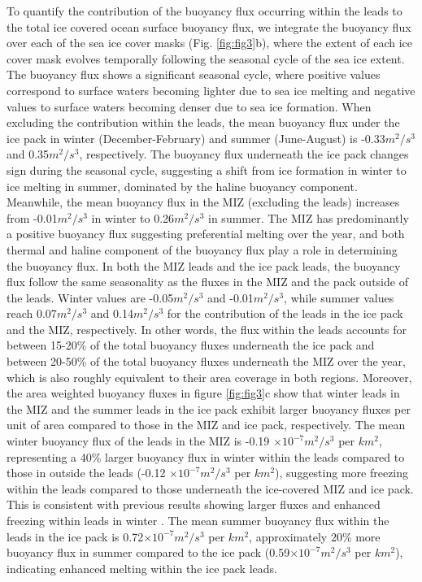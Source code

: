 \documentclass[lineno,sn-basic]{sn-jnl}%
\begin{document}
To quantify the contribution of the buoyancy flux occurring within the leads to the total ice covered ocean surface buoyancy flux, we integrate the buoyancy flux over each of the sea ice cover masks (Fig. \ref{fig:fig3}b), where the extent of each ice cover mask evolves temporally following the seasonal cycle of the sea ice extent. The buoyancy flux shows a significant seasonal cycle, where positive values correspond to surface waters becoming lighter due to sea ice melting and negative values to surface waters becoming denser due to sea ice formation.
When excluding the contribution within the leads, the mean buoyancy flux under the ice pack in winter (December-February) and summer (June-August) is -0.33$m^2/s^3$  and 0.35$m^2/s^3$, respectively. The buoyancy flux underneath the ice pack changes sign during the seasonal cycle, suggesting a shift from ice formation in winter to ice melting in summer, dominated by the haline buoyancy component. Meanwhile, the mean buoyancy flux in the MIZ (excluding the leads) increases from -0.01$m^2/s^3$ in winter to 0.26$m^2/s^3$ in summer. The MIZ has predominantly a positive buoyancy flux suggesting preferential melting over the year, and both thermal and haline component of the buoyancy flux play a role in determining the buoyancy flux. In both the MIZ leads and the ice pack leads, the buoyancy flux follow the same seasonality as the fluxes in the MIZ and the pack outside of the leads.  Winter values are -0.05$m^2/s^3$ and -0.01$m^2/s^3$, while summer values reach 0.07$m^2/s^3$ and 0.14$m^2/s^3$ for the contribution of the leads in the ice pack and the MIZ, respectively.
In other words, the flux within the leads accounts for between 15-20\% of the total buoyancy fluxes underneath the ice pack and between 20-50\% of the total buoyancy fluxes underneath the MIZ over the year, which is also roughly equivalent to their area coverage in both regions.
Moreover, the area weighted buoyancy fluxes in figure \ref{fig:fig3}c show that winter leads in the MIZ and the summer leads in the ice pack exhibit larger buoyancy fluxes per unit of area compared to those in the MIZ and ice pack, respectively. 
The mean winter buoyancy flux of the leads in the MIZ is 
-0.19 $\times10^{-7} m^2/s^3$ per $km^2$, representing a 40\% larger buoyancy flux in winter within the leads compared to those in outside the leads (-0.12 $\times10^{-7} m^2/s^3$ per $km^2$), suggesting more freezing within the leads compared to those underneath the ice-covered MIZ and ice pack. This is consistent with previous results showing larger fluxes and enhanced freezing within leads in winter \citep{Boutin_rheology_2023}. 
The mean summer buoyancy flux within the leads in the ice pack is 0.72$\times10^{-7} m^2/s^3$ per $km^2$, approximately 20\% more buoyancy flux in summer compared to the ice pack (0.59$\times10^{-7} m^2/s^3$ per $km^2$), indicating enhanced melting within the ice pack leads. 
\end{document}
